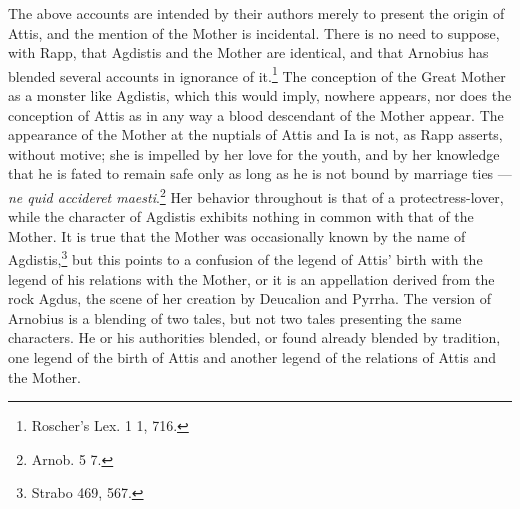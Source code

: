 \documentclass[a4paper, 11pt, oneside, polutonikogreek, french]{article}
\begin{document}
The above accounts are intended by their authors merely to present the origin of Attis, and the mention of the Mother is incidental. There is no need to suppose, with Rapp, that Agdistis and the Mother are identical, and that Arnobius has blended several accounts in ignorance of it.\footnote{Roscher's Lex. 1 1, 716.} The conception of the Great Mother as a monster like Agdistis, which this would imply, nowhere appears, nor does the conception of Attis as in any way a blood descendant of the Mother appear. The appearance of the Mother at the nuptials of Attis and Ia is not, as Rapp asserts, without motive; she is impelled by her love for the youth, and by her knowledge that he is fated to remain safe only as long as he is not bound by marriage ties --- \emph{ne quid accideret maesti}.\footnote{Arnob. 5 7.} Her behavior throughout is that of a protectress-lover, while the character of Agdistis exhibits nothing in common with that of the Mother. It is true that the Mother was occasionally known by the name of Agdistis,\footnote{Strabo 469, 567.} but this points to a confusion of the legend of Attis' birth with the legend of his relations with the Mother, or it is an appellation derived from the rock Agdus, the scene of her creation by Deucalion and Pyrrha. The version of Arnobius is a blending of two tales, but not two tales presenting the same characters. He or his authorities blended, or found already blended by tradition, one legend of the birth of Attis and another legend of the relations of Attis and the Mother.
\end{document}

